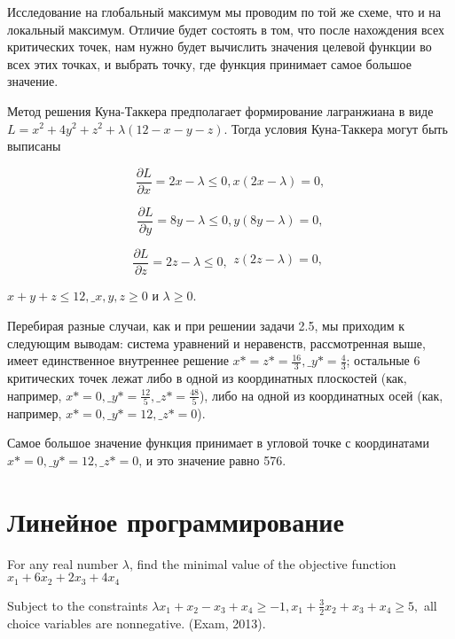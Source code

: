 \begin{solution}
Исследование на глобальный максимум мы проводим по той же схеме, что и на локальный максимум. Отличие будет состоять в том, что после нахождения всех критических точек, нам нужно будет вычислить значения целевой функции во всех этих точках, и выбрать точку, где функция принимает самое большое значение.

Метод решения Куна-Таккера предполагает формирование лагранжиана в виде $L=x^{2} +4y^{2} +z^{2} +\lambda (12-x-y-z)$. Тогда условия Куна-Таккера могут быть выписаны

\[\frac{\partial L}{\partial x} =2x-\lambda \le 0, x(2x-\lambda )=0,\] 

\[\frac{\partial L}{\partial y} =8y-\lambda \le 0, y(8y-\lambda )=0,\] 

\[\frac{\partial L}{\partial z} =2z-\lambda \le 0,  \begin{array}{l} {z(2z-\lambda )=0,} \\ {} \end{array}\] 

$x+y+z\le 12,\_ x,y,z\ge 0$ и $\lambda \ge 0.$

Перебирая разные случаи, как и при решении задачи 2.5, мы приходим к следующим выводам: система уравнений и неравенств, рассмотренная выше, имеет единственное внутреннее решение $x*=z*=\frac{16}{3} ,\_ y*=\frac{4}{3} $; остальные 6 критических точек лежат либо в одной из координатных плоскостей (как, например, $x*=0,\_ y*=\frac{12}{5} ,\_ z*=\frac{48}{5} $), либо на одной из координатных осей (как, например, $x*=0,\_ y*=12,\_ z*=0$).

Самое большое значение функция принимает в угловой точке с координатами $x*=0,\_ y*=12,\_ z*=0$, и это значение равно 576.
\end{solution}



\section{Линейное программирование}

\begin{problem}
For any real number $\lambda $, find the minimal value of the objective function $x_{1} +6x_{2} +2x_{3} +4x_{4} $

Subject to the constraints $\lambda x_{1} +x_{2} -x_{3} +x_{4} \ge -1,  x_{1} +\frac{3}{2} x_{2} +x_{3} +x_{4} \ge 5,$ all choice variables are nonnegative. (Exam, 2013).
\end{problem}


